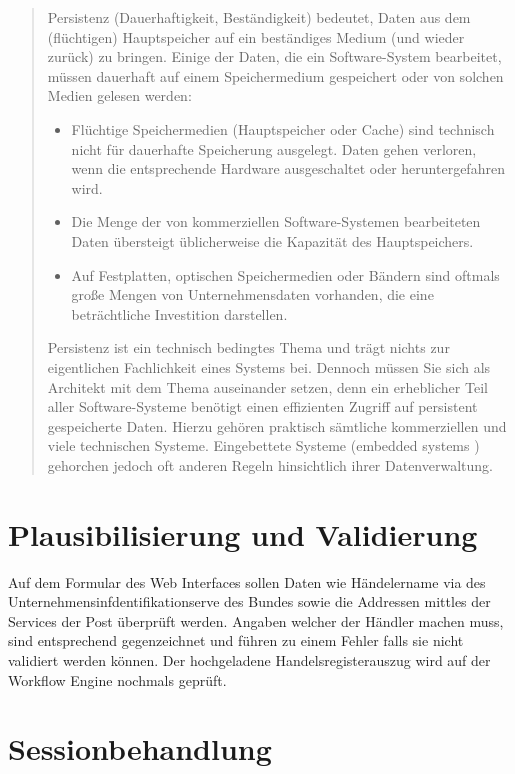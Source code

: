 \begin{quote}
	Persistenz (Dauerhaftigkeit, Beständigkeit) bedeutet, Daten aus dem (flüchtigen) Hauptspeicher auf ein beständiges Medium (und wieder zurück) zu bringen.
	Einige der Daten, die ein Software-System bearbeitet, müssen dauerhaft auf einem Speichermedium gespeichert oder von solchen Medien gelesen werden:
	\begin{itemize}
		\item Flüchtige Speichermedien (Hauptspeicher oder Cache) sind technisch nicht für dauerhafte Speicherung ausgelegt. Daten gehen verloren, wenn die entsprechende Hardware ausgeschaltet oder heruntergefahren wird.
		\item Die Menge der von kommerziellen Software-Systemen bearbeiteten Daten übersteigt üblicherweise die Kapazität des Hauptspeichers.
		\item Auf Festplatten, optischen Speichermedien oder Bändern sind oftmals große Mengen von Unternehmensdaten vorhanden, die eine beträchtliche Investition darstellen.
	\end{itemize}
	Persistenz ist ein technisch bedingtes Thema und trägt nichts zur eigentlichen Fachlichkeit eines Systems bei. Dennoch müssen Sie sich als Architekt mit dem Thema auseinander setzen, denn ein erheblicher Teil aller Software-Systeme benötigt einen effizienten Zugriff auf persistent gespeicherte Daten. Hierzu gehören praktisch sämtliche kommerziellen und viele technischen Systeme. Eingebettete Systeme (embedded systems ) gehorchen jedoch oft anderen Regeln hinsichtlich ihrer Datenverwaltung.
\end{quote}

\section{Plausibilisierung und Validierung}

Auf dem Formular des Web Interfaces sollen Daten wie Händelername via des Unternehmensinfdentifikationserve des Bundes sowie die Addressen mittles der Services der Post überprüft werden. Angaben welcher der Händler machen muss, sind entsprechend gegenzeichnet und führen zu einem Fehler falls sie nicht validiert werden können. Der hochgeladene Handelsregisterauszug wird auf der Workflow Engine nochmals geprüft.

\section{Sessionbehandlung}

